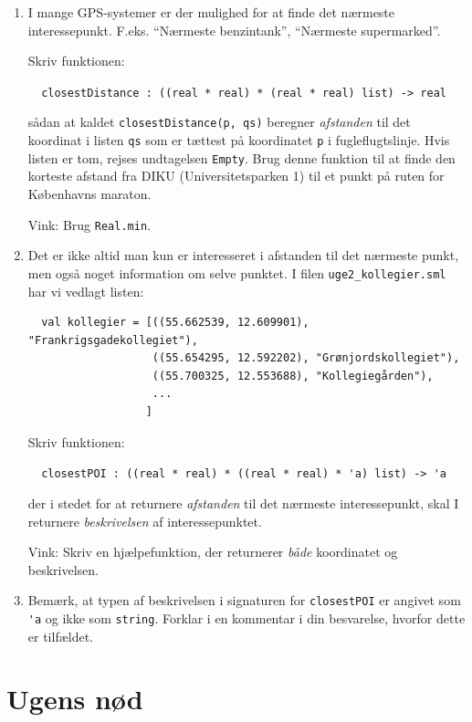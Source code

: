 \documentclass[a4paper,12pt]{article}
\begin{document}
\begin{enumerate}[{2I}1]

\item I mange GPS-systemer er der mulighed for at finde det nærmeste
  interessepunkt. F.eks. "`Nærmeste benzintank"', "`Nærmeste
  supermarked"'.

  Skriv funktionen:

  \verb|  closestDistance : ((real * real) * (real * real) list) -> real|

  sådan at kaldet \verb|closestDistance(p, qs)| beregner
  \textit{afstanden} til det koordinat i listen \verb|qs| som er
  tættest på koordinatet \verb|p| i fugleflugtslinje.  Hvis listen er tom, rejses
  undtagelsen \verb|Empty|.  Brug denne funktion til at finde den
  korteste afstand fra DIKU (Universitetsparken 1) til et punkt på
  ruten for Københavns maraton.

  Vink: Brug \verb|Real.min|.

\item Det er ikke altid man kun er interesseret i afstanden til det
  nærmeste punkt, men også noget information om selve punktet. I filen
  \verb|uge2_kollegier.sml| har vi vedlagt listen:
  \begin{verbatim}
  val kollegier = [((55.662539, 12.609901), "Frankrigsgadekollegiet"),
                   ((55.654295, 12.592202), "Grønjordskollegiet"),
                   ((55.700325, 12.553688), "Kollegiegården"),
                   ...
                  ]
  \end{verbatim}
  Skriv funktionen:

  \verb|  closestPOI : ((real * real) * ((real * real) * 'a) list) -> 'a|

  der i stedet for at returnere \textit{afstanden} til det nærmeste
  interessepunkt, skal I returnere \textit{beskrivelsen} af
  interessepunktet.

  Vink: Skriv en hjælpefunktion, der returnerer \textit{både}
  koordinatet og beskrivelsen.

\item Bemærk, at typen af beskrivelsen i signaturen for \verb|closestPOI|
  er angivet som \verb|'a| og ikke som \verb|string|.  Forklar i en
  kommentar i din besvarelse, hvorfor dette er tilfældet.

\end{enumerate}

\section{Ugens nød}
\label{sec:ugens-nod}
\end{document}
